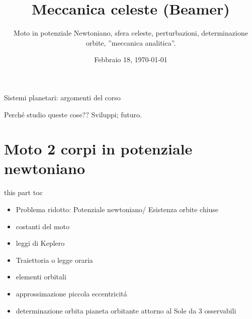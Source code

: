 \documentclass[10pt,xcolor={usenames},fleqn,mathserif,serif]{beamer}
\title{Meccanica celeste (Beamer)}
\subtitle{Moto in potenziale Newtoniano, sfera celeste, perturbazioni, determinazione orbite, ''meccanica analitica''.}
\date{Febbraio 18, \today}
\begin{document}



\begin{frame}
  \titlepage
\end{frame}


\begin{frame}[label={argomenti}]{Sistemi planetari: argomenti del corso}

\tableofcontents[onlyparts]


\end{frame}

\begin{wordonframe}{Perch\'e studio queste cose?? Sviluppi; futuro.}


\end{wordonframe}


\part{Moto 2 corpi in potenziale newtoniano}\label{part:kepler}
\frame{\partpage}

\begin{frame}{this part toc}

\begin{itemize}

\item Problema ridotto: Potenziale newtoniano/ Esistenza orbite chiuse
\item costanti del moto
\item leggi di Keplero
\item Traiettoria o legge oraria
\item elementi orbitali
\item approssimazione piccola eccentricit\'a
\item determinazione orbita pianeta orbitante attorno al Sole da 3 osservabili

\end{itemize}

\end{frame}
\end{document}
